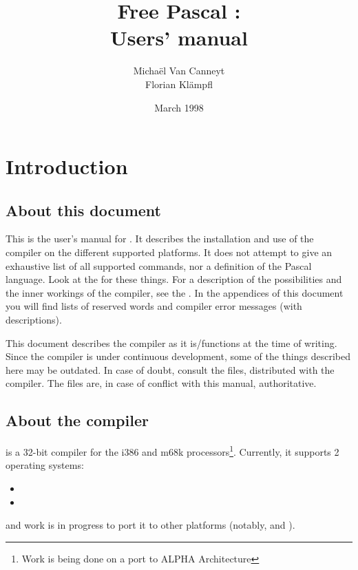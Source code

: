 \documentclass{report}
\begin{document}
\title{Free Pascal :\\ Users' manual}
\date{March 1998}
\author{Micha\"el Van Canneyt\\Florian Kl\"ampfl}
\maketitle
\tableofcontents
\chapter{Introduction}

\section{About this document}
This is the user's manual for \fpc . It describes the installation and use of
the \fpc compiler on the different supported platforms. 
It does not attempt to give an exhaustive list of all supported commands,
nor a definition of the Pascal language. Look at the
 for these things. 
For a description of the
possibilities and the inner workings of the compiler, see the
\progref. In the appendices of this document you will find lists of 
reserved words and compiler error messages (with descriptions).

This document describes the compiler as it is/functions at the time of 
writing. Since the compiler is under continuous development, some of the
things described here may be outdated. In case of doubt, consult the
 files, distributed with the compiler. 
The  files are, in case of conflict with this manual,
 authoritative.


\section{About the compiler}
\fpc is a 32-bit compiler for the i386 and m68k processors\footnote{Work is being done
on a port to ALPHA Architecture}. Currently, it supports 2 operating systems:
\begin{itemize}
\item \dos
\item \linux
\end{itemize}
and work is in progress to port it to other platforms (notably, \ostwo and
\windowsnt).
\end{document}
